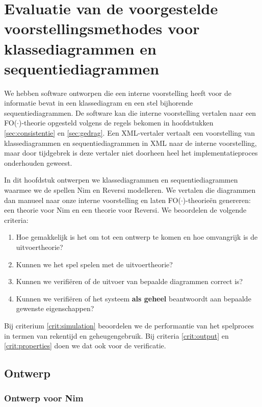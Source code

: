 \chapter{Evaluatie van de voorgestelde voorstellingsmethodes voor klassediagrammen en sequentiediagrammen}\label{sec:evaluatie}
We hebben software ontworpen die een interne voorstelling heeft voor de informatie bevat in een klassediagram en een stel bijhorende sequentiediagrammen. De software kan die interne voorstelling vertalen naar een FO($\cdot$)-theorie opgesteld volgens de regels bekomen in hoofdstukken \ref{sec:consistentie} en \ref{sec:gedrag}. Een XML-vertaler vertaalt een voorstelling van klassediagrammen en sequentiediagrammen in XML naar de interne voorstelling, maar door tijdgebrek is deze vertaler niet doorheen heel het implementatieproces onderhouden geweest.

In dit hoofdstuk ontwerpen we klassediagrammen en sequentiediagrammen waarmee we de spellen Nim en Reversi modelleren. We vertalen die diagrammen dan manueel naar onze interne voorstelling en laten FO($\cdot$)-theorie\"en genereren: een theorie voor Nim en een theorie voor Reversi. We beoordelen de volgende criteria:

\begin{enumerate}
	\item Hoe gemakkelijk is het om tot een ontwerp te komen en hoe omvangrijk is de uitvoertheorie?\label{crit:design}
	\item Kunnen we het spel spelen met de uitvoertheorie?\label{crit:simulation}
	\item Kunnen we verifi\"eren of de uitvoer van bepaalde diagrammen correct is?\label{crit:output}
	\item Kunnen we verifi\"eren of het systeem \textbf{als geheel} beantwoordt aan bepaalde gewenste eigenschappen?\label{crit:properties}
\end{enumerate}

Bij criterium \ref{crit:simulation} beoordelen we de performantie van het spelproces in termen van rekentijd en geheugengebruik. Bij criteria \ref{crit:output} en \ref{crit:properties} doen we dat ook voor de verificatie.

\section{Ontwerp}\label{sec:eval-design}

\subsection{Ontwerp voor Nim}\label{sec:nim-design}

